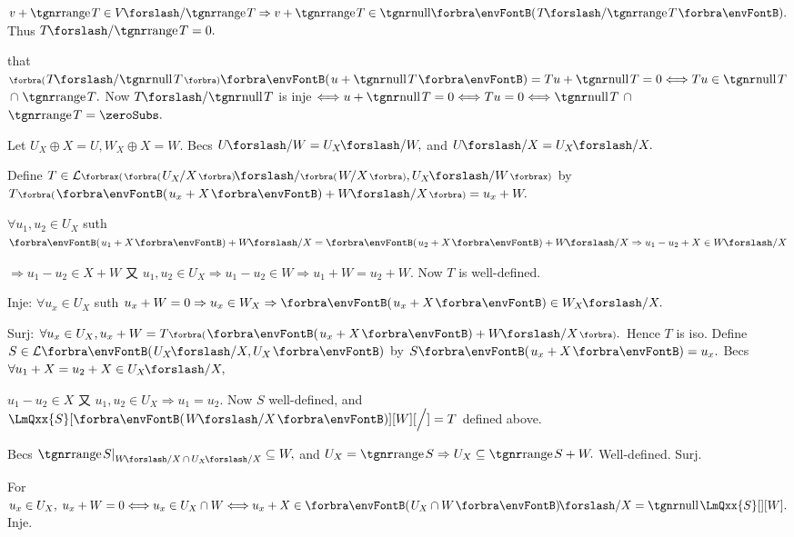 $v+\range T\in V\XSlash \range T\Rightarrow v+\range T\in\Null\Par{T\XSlash{\range T}}.$ Thus $T\XSlash{\range T}=0.$\PfEnd
\SepLine

\NOTICE that $\BigPar{T\XSlash{\null T}}\Par{u+\null T}=Tu+\null T=0\Longleftrightarrow Tu\in{\null T}${\Large${}\cap{}$}${\range T}.$\parSol{}
Now $T\XSlash{\null T}$ is inje $\Longleftrightarrow u+\null T=0\Longleftrightarrow Tu=0 \Longleftrightarrow{\null T}${\Large${}\cap{}$}${\range T}=\zeroSubs.$\PfEnd
\SepLine

Let $U_X\oplus X=U,W_X\oplus X=W.$ Becs $U\XSlash W=U_X\XSlash W,$ and $U\XSlash X=U_X\XSlash X.$\vspace{1pt}\par\quad
Define $T\in\Lm[\XPar]{\BigPar{U_X\hspace{-1pt}\Slash X}\XSlash\BigPar{W\hspace{-1.5pt}\Slash X},U_X\XSlash W}$ by $T\BigPar{\Par{u_x+X}+W\XSlash X}=u_x+W.$\par\quad
$\forall u_1,u_2\in U_X$ suth $\Par{u_1+X}+W\XSlash X=\Par{u_2+X}+W\XSlash X\Rightarrow u_1-u_2+X\in W\XSlash X$\par\quad
$\Rightarrow u_1-u_2\in X+W$ 又 $u_1,u_2\in U_X\Rightarrow u_1-u_2\in W\Rightarrow u_1+W=u_2+W.$ \;Now $T$ is well-defined.\par\quad
Inje: $\forall u_x\in U_X$ suth $u_x+W=0\Rightarrow u_x\in W_X\Rightarrow\Par{u_x+X}\in W_X\XSlash X.$\par\quad
Surj: $\forall u_x\in U_X,u_x+W=T\BigPar{\Par{u_x+X}+W\XSlash X}.$ \;Hence $T$ is iso.\PfEnd\vspace{6pt}\quad
\Or Define $S\in\Lm{U_X\XSlash X,U_X}$ by $S\Par{u_x+X}=u_x.$
Becs $\forall u_1+X=u_2+X\in U_X\XSlash X,$\par\quad
$u_1-u_2\in X$ 又 $u_1,u_2\in U_X\Rightarrow u_1=u_2.$ Now $S$ well-defined, and $\LmQxx{S}[\SmallPar{W\XSlash X}][W][\Big/]=T$ defined above.\par\quad
Becs $\range S\mmid_{W\XSlash X\,\cap\,U_X\XSlash X}\subseteq W,$ and $U_X=\range S\Rightarrow U_X\subseteq\range S+W.$ \;Well-defined. Surj.\par\quad
For $u_x\in U_X,\;u_x+W=0\Longleftrightarrow u_x\in U_X\cap W\Longleftrightarrow u_x+X\in\Par{U_X\cap W}\XSlash X=\null\LmQxx{S}[][W].$ \;Inje.\PfEnd
\SepLine

